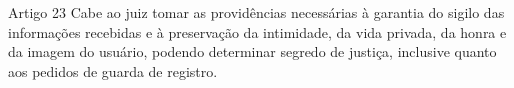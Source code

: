 \begin{frame}{Artigo 23}
Cabe ao juiz tomar as providências necessárias à garantia do sigilo das informações recebidas e à preservação da intimidade, da vida privada, da honra e da imagem do usuário, podendo determinar segredo de justiça, inclusive quanto aos pedidos de guarda de registro.
\end{frame}